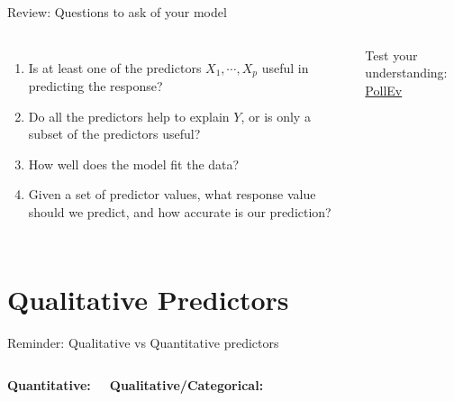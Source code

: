 \documentclass[aspectratio=169,usenames,dvipsnames]{beamer}
\newcommand{\InstructorList}[1]{
\begin{itemize}
	\color{orange}
	#1
\end{itemize}
}
\renewcommand{\InstructorList}[1]{}
\begin{document}
\begin{frame}[c]{Review: Questions to ask of your model }

	\begin{columns}
	\centering
	\begin{enumerate}
		\item Is at least one of the predictors $X_1, \cdots, X_p$ useful in predicting the response?
	\item Do all the predictors help to explain $Y$, or is only a subset of the predictors useful?
	\item How well does the model fit the data?
	\item Given a set of predictor values, what response value should we predict, and how accurate is our prediction?
	
	\end{enumerate}

	Test your understanding: \href{https://PollEv.com/multiple_choice_polls/mdZHSz9oQiNNvBuAYDjU0/respond}{PollEv}
	\centering
	\InstructorList{
	\item Hypothesis test, F-statistic, at least one $\beta_j$ is non-zero
	\item Forward and Backward selection
	\item RSE, $R^2$, eyeball test
	\item Confidence intervals and prediction intervals
	
	}
	\end{columns}
	
	\end{frame}
\section{Qualitative Predictors}
\begin{frame}[t]{Reminder: Qualitative vs Quantitative predictors}
\begin{columns}
\centering
\textbf{Quantitative:}
\InstructorList{
  \item Anything with values in either integers or real numbers 
  \item Temperature 
  \item Year (even though integers)
  \item Weight 
  \item Number of cylinders in a car 
}

\centering
\textbf{Qualitative/Categorical:}
\InstructorList{
  \item Anything from an unordered set 
  \item Country of origin 
  \item Brand names 
  \item Anything yes/no (married, has a cat)
}

\end{columns}
\end{frame}
\end{document}
